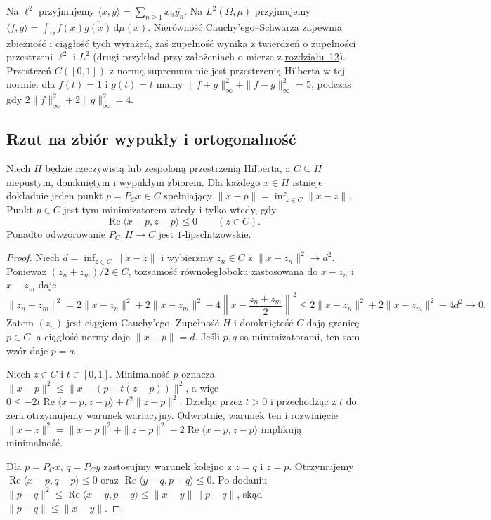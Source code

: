 \begin{przyklad}
\label{ex:hilbert-l2-13}
Na $\ell^2$ przyjmujemy $\langle x,y\rangle=\sum_{n\ge1}x_n\overline{y_n}$.
Na $L^2(\Omega,\mu)$ przyjmujemy
$\langle f,g\rangle=\int_\Omega f(x)\overline{g(x)}\,\mathrm d\mu(x)$.
Nierówność Cauchy'ego--Schwarza zapewnia zbieżność i ciągłość tych
wyrażeń, zaś zupełność wynika z
twierdzeń o zupełności przestrzeni $\ell^2$ i $L^2$
(drugi przykład przy założeniach o mierze z \hyperref[sec:klasyczne-banach12]{rozdziału~12}).
Przestrzeń $C([0,1])$ z normą supremum nie jest przestrzenią Hilberta w tej normie:
dla $f(t)=1$ i $g(t)=t$ mamy
$\|f+g\|_\infty^2+\|f-g\|_\infty^2=5$,
podczas gdy $2\|f\|_\infty^2+2\|g\|_\infty^2=4$.
\end{przyklad}

\subsection{Rzut na zbiór wypukły i ortogonalność}

\begin{twierdzenie}
\label{thm:projection-convex13}
Niech $H$ będzie rzeczywistą lub zespoloną przestrzenią Hilberta,
a $C\subseteq H$ niepustym, domkniętym i wypukłym zbiorem.
Dla każdego $x\in H$ istnieje dokładnie jeden punkt $p=P_Cx\in C$
spełniający $\|x-p\|=\inf_{z\in C}\|x-z\|$.
Punkt $p\in C$ jest tym minimizatorem wtedy i tylko wtedy, gdy
\[
\operatorname{Re}\langle x-p,z-p\rangle\le0\qquad(z\in C).
\]
Ponadto odwzorowanie $P_C:H\to C$ jest $1$-lipschitzowskie.
\end{twierdzenie}
\begin{proof}
Niech $d=\inf_{z\in C}\|x-z\|$ i wybierzmy $z_n\in C$ z
$\|x-z_n\|^2\to d^2$. Ponieważ $(z_n+z_m)/2\in C$,
tożsamość równoległoboku zastosowana do $x-z_n$ i $x-z_m$ daje
\[
\|z_n-z_m\|^2
=2\|x-z_n\|^2+2\|x-z_m\|^2
-4\left\|x-\frac{z_n+z_m}{2}\right\|^2
\le2\|x-z_n\|^2+2\|x-z_m\|^2-4d^2\longrightarrow0.
\]
Zatem $(z_n)$ jest ciągiem Cauchy'ego. Zupełność $H$ i domkniętość
$C$ dają granicę $p\in C$, a ciągłość normy daje $\|x-p\|=d$.
Jeśli $p,q$ są minimizatorami, ten sam wzór daje $p=q$.

Niech $z\in C$ i $t\in[0,1]$. Minimalność $p$ oznacza
$\|x-p\|^2\le\|x-(p+t(z-p))\|^2$,
a więc
$0\le-2t\operatorname{Re}\langle x-p,z-p\rangle+t^2\|z-p\|^2$.
Dzieląc przez $t>0$ i przechodząc z $t$ do zera otrzymujemy
warunek wariacyjny. Odwrotnie, warunek ten i rozwinięcie
$\|x-z\|^2=\|x-p\|^2+\|z-p\|^2-
2\operatorname{Re}\langle x-p,z-p\rangle$ implikują minimalność.

Dla $p=P_Cx$, $q=P_Cy$ zastosujmy warunek kolejno z $z=q$
i $z=p$. Otrzymujemy
$\operatorname{Re}\langle x-p,q-p\rangle\le0$ oraz
$\operatorname{Re}\langle y-q,p-q\rangle\le0$. Po dodaniu
$\|p-q\|^2\le\operatorname{Re}\langle x-y,p-q\rangle
\le\|x-y\|\|p-q\|$, skąd $\|p-q\|\le\|x-y\|$.
\end{proof}


